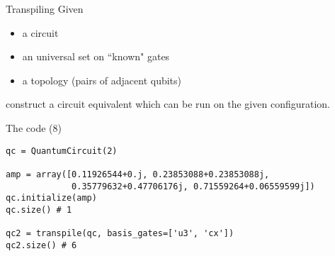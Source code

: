 \begin{frame}{Transpiling}
Given 
\begin{itemize}
    \item a circuit
    \item an universal set on ``known" gates
    \item a topology (pairs of adjacent qubits)
\end{itemize}
construct a circuit equivalent which can be run on the given configuration.

\end{frame}

\begin{frame}[fragile]{The code (8)}
\begin{verbatim}
qc = QuantumCircuit(2)

amp = array([0.11926544+0.j, 0.23853088+0.23853088j, 
             0.35779632+0.47706176j, 0.71559264+0.06559599j])
qc.initialize(amp)
qc.size() # 1

qc2 = transpile(qc, basis_gates=['u3', 'cx'])
qc2.size() # 6
\end{verbatim}
\end{frame}